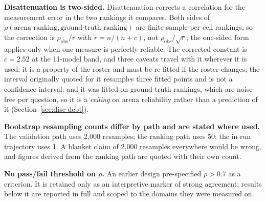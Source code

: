 \textbf{Disattenuation is two-sided.} Disattenuation corrects a
correlation for the measurement error in the two rankings it compares.
Both sides of
$\rho(\text{arena ranking}, \text{ground-truth ranking})$ are
finite-sample per-cell rankings, so the correction is $\rho_{\text{obs}}
/ r$ with $r = n/(n+c)$, not $\rho_{\text{obs}} / \sqrt{r}$; the
one-sided form applies only when one measure is perfectly reliable. The
corrected constant is $c = 2.52$ at the 11-model band, and three
caveats travel with it wherever it is used: it is a property of the
roster and must be re-fitted if the roster changes; the interval
originally quoted for it resamples three fitted points and is not a
confidence interval; and it was fitted on ground-truth rankings, which
are noise-free per question, so it is a \emph{ceiling} on arena
reliability rather than a prediction of it
(Section~\ref{sec:disc-debt}).

\textbf{Bootstrap resampling counts differ by path and are stated where
used.} The validation path uses 2{,}000 resamples; the ranking path
uses 50; the in-run trajectory uses 1. A blanket claim of 2{,}000
resamples everywhere would be wrong, and figures derived from the
ranking path are quoted with their own count.

\textbf{No pass/fail threshold on $\rho$.} An earlier design
pre-specified $\rho > 0.7$ as a criterion. It is retained only as an
interpretive marker of strong agreement; results below it are reported
in full and scoped to the domains they were measured on.
